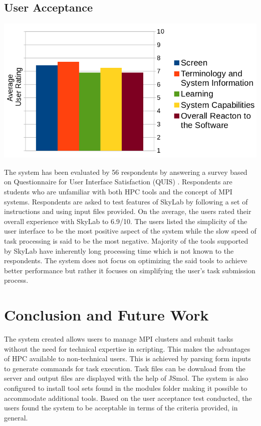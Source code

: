 \documentclass[journal]{./IEEE/IEEEtran}
\begin{document}
	\subsection{User Acceptance}
	\begin{center}			
			\includegraphics[scale=0.32]{./images/uat_graph.png}			
	\end{center}
	The system has been evaluated by 56 respondents by answering a survey based on Questionnaire for User Interface Satisfaction (QUIS) \cite{chin1988development}. Respondents are students who are unfamiliar with both HPC tools and the concept of MPI systems.  Respondents are asked to test features of SkyLab by following a set of instructions and using input files provided. On the average, the users rated their overall experience with SkyLab to 6.9/10. The users listed the simplicity of the user interface to be the most positive aspect of the system while the slow speed of task processing is said to be the most negative. Majority of the tools supported by SkyLab have inherently long processing time which is not known to the respondents. The system does not focus on optimizing the said tools to achieve better performance but rather it focuses on simplifying the user's task submission process. 

	
\section{Conclusion and Future Work}
The system created allows users to manage MPI clusters and submit tasks without the need for technical expertise in scripting. This makes the advantages of HPC available to non-technical users. This is achieved by parsing form inputs to generate commands for task execution. Task files can be download from the server and output files are displayed with the help of JSmol\cite{IJCH:IJCH201300024}. The system is also configured to install tool sets found in the modules folder making it possible to accommodate additional tools. Based on the user acceptance test conducted, the users found the system to be acceptable in terms of the criteria provided, in general. 
\end{document}
